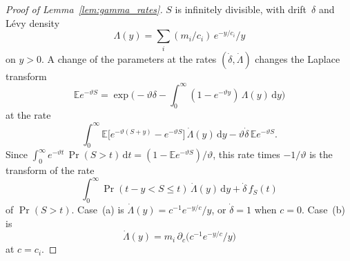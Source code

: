 \documentclass[11pt,a4paper]{article}
\theoremstyle{plain}
\theoremstyle{definition}
\theoremstyle{remark}
\begin{document}
\label{prf:lem:gamma_rates}
\begin{proof}[Proof of Lemma~\ref{lem:gamma_rates}]
$S$ is infinitely divisible, with drift~$\delta$ and L\'evy density
\begin{equation}
  \Lambda(y) = \sum_i (m_i/c_i)\, e^{-y/c_i}/y
\end{equation}
on $y > 0$.
A change of the parameters at the rates $(\dot\delta, \dot\Lambda)$ changes the Laplace transform
\begin{equation}
  \mathbb{E}e^{-\vartheta S} = \exp\bigl(-\vartheta\delta - \int_0^\infty (1 - e^{-\vartheta y})\,\Lambda(y)\, \mathrm{d}y\bigr)
\end{equation}
at the rate
\begin{equation}
  \int_0^\infty \mathbb{E}\bigl[e^{-\vartheta(S+y)} - e^{-\vartheta S}\bigr]\,\dot\Lambda(y)\, \mathrm{d}y - \vartheta\dot\delta\,\mathbb{E}e^{-\vartheta S}.
\end{equation}
Since $\int_0^\infty e^{-\vartheta t}\,\Pr(S > t)\,\mathrm{d}t = (1 - \mathbb{E}e^{-\vartheta S})/\vartheta$, this rate times $-1/\vartheta$ is the transform of the rate
\begin{equation}
  \int_0^\infty \Pr(t - y < S \le t)\,\dot\Lambda(y)\, \mathrm{d}y + \dot\delta\, f_S(t)
\end{equation}
of $\Pr(S > t)$.
Case~(a) is $\dot\Lambda(y) = c^{-1}e^{-y/c}/y$, or $\dot\delta = 1$ when $c = 0$.
Case~(b) is
\begin{equation}
  \dot\Lambda(y) = m_i\,\partial_c\bigl(c^{-1}e^{-y/c}/y\bigr)
\end{equation}
at $c = c_i$.
\end{proof}
\end{document}
